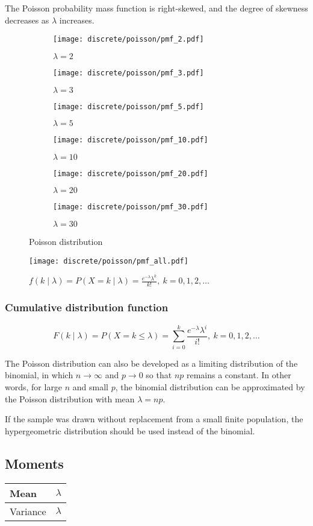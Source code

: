 The Poisson probability mass function is right-skewed, and the degree of skewness decreases as $\lambda$ increases.

\begin{figure}[H]
	\centering
	\begin{subfigure}[b]{0.45\textwidth}
		\texttt{[image: discrete/poisson/pmf\_2.pdf]}
		\caption{$\lambda = 2$}
		\label{fig:P2}
	\end{subfigure}
	\begin{subfigure}[b]{0.45\textwidth}
	\texttt{[image: discrete/poisson/pmf\_3.pdf]}
	\caption{$\lambda = 3$}
	\label{fig:P3}
	\end{subfigure}
	\begin{subfigure}[b]{0.45\textwidth}
		\texttt{[image: discrete/poisson/pmf\_5.pdf]}
		\caption{$\lambda = 5$}
		\label{fig:P5}
	\end{subfigure}
	\begin{subfigure}[b]{0.45\textwidth}
		\texttt{[image: discrete/poisson/pmf\_10.pdf]}
		\caption{$\lambda = 10$}
		\label{fig:P10}
	\end{subfigure}
	\begin{subfigure}[b]{0.45\textwidth}
		\texttt{[image: discrete/poisson/pmf\_20.pdf]}
		\caption{$\lambda = 20$}
		\label{fig:P20}
	\end{subfigure}
	\begin{subfigure}[b]{0.45\textwidth}
		\texttt{[image: discrete/poisson/pmf\_30.pdf]}
		\caption{$\lambda = 30$}
		\label{fig:P30}
	\end{subfigure}
	\caption{Poisson distribution}\label{fig:poisson}
\end{figure}

\begin{figure}[H]
	\texttt{[image: discrete/poisson/pmf\_all.pdf]}
	\caption{$f(k \mid \lambda) = P(X = k \mid \lambda) = \frac{e^{-\lambda} \lambda^k}{k!}, \ k = 0, 1, 2, \ldots$}
\end{figure}

\subsubsection{Cumulative distribution function}
\[
	F(k \mid \lambda) = P(X = k \leq \lambda) = \sum_{i = 0}^{k} \frac{e^{-\lambda} \lambda^i}{i!}, \ k = 0, 1, 2, \ldots
\]

The Poisson distribution can also be developed as a limiting distribution of the binomial, in which $n \rightarrow \infty$ and $p \rightarrow 0$ so that $np$ remains a constant. In other words, for large $n$ and small $p$, the binomial distribution can be approximated by the Poisson distribution with mean $\lambda = np$.

If the sample was drawn without replacement from a small finite population, the hypergeometric distribution should be used instead of the binomial.

\subsection{Moments}

\begin{tabularx}{\textwidth}{s X}
	\hline
	Mean & $\lambda$ \\\hline
	Variance & $\lambda$\\\hline
\end{tabularx}
